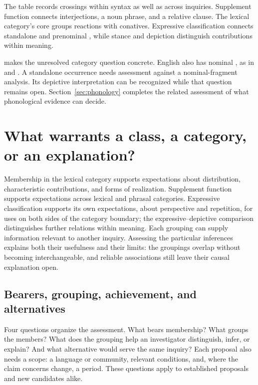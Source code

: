 \documentclass[12pt]{article}
\begin{document}
The table records crossings within syntax as well as across inquiries.
Supplement function connects interjections, a noun phrase, and a relative
clause. The lexical category's core groups reactions with conatives.
Expressive classification connects standalone and prenominal ,
while stance and depiction distinguish contributions within meaning.

 makes the unresolved category question concrete.
English also has nominal , as in
 and . A standalone occurrence
needs assessment against a nominal-fragment analysis.
Its depictive interpretation can be recognized while that question remains
open. Section~\ref{sec:phonology} completes the related assessment of
what phonological evidence can decide.

\section{What warrants a class, a category, or an explanation?}\label{sec:assessment}

Membership in the lexical category supports expectations about distribution,
characteristic contributions, and forms of realization. Supplement function
supports expectations across lexical and phrasal categories. Expressive
classification supports its own expectations, about perspective and
repetition, for uses on both sides of the category boundary; the
expressive--depictive
comparison distinguishes further relations within meaning. Each grouping
can supply information relevant to another inquiry. Assessing the particular
inferences explains both their usefulness and their limits: the groupings
overlap without becoming interchangeable, and reliable associations still
leave their causal explanation open.

\subsection{Bearers, grouping, achievement, and alternatives}

Four questions organize the assessment. What bears membership? What groups
the members? What does the grouping help an investigator distinguish,
infer, or explain? And what alternative would serve the same inquiry?
Each proposal also needs a scope: a language or community, relevant
conditions, and, where the claim concerns change, a period. These
questions apply to established proposals and new candidates alike.
\end{document}
